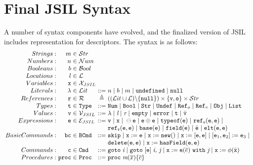 \documentclass[a4paper,11pt,twoside]{report}
\begin{document}
\section{Final JSIL Syntax}\label{sec:finjsilsyntax}
A number of syntax components have evolved, and the finalized version of JSIL includes representation for descriptors. The syntax is as follows:
$$
\arraycolsep=1.5pt
\begin{array}{rrclcl}
Strings : &  m & \in & \mathcal{S}tr \\
Numbers : &  n & \in & \mathcal{N}um \\
Booleans : &  b & \in & \mathcal{B}ool \\
Locations : &  l & \in & \mathcal{L} \\
Variables : &  \mathtt{x} & \in & \mathcal{X}_{JSIL} \\
Literals : &  \mathtt{\lambda} & \in & \mathcal{L}it & ::= & n \myor b \myor m \myor \mathtt{undefined} \myor \mathtt{null} \\
References : &  \mathtt{r} & \in & \mathcal{R} & \triangleq & ((\mathcal{L}it \cup \mathcal{L}) \backslash \{ \mathtt{null} \}) \times \{ \mathtt{v, o} \} \times \mathcal{S}tr\\
Types: & \mathtt{t} & \in & \mathtt{Type} & ::= & \mathtt{Num} \myor \mathtt{Bool} \myor \mathtt{Str} \myor \mathtt{Undef} \myor \mathtt{Ref}_o \myor \mathtt{Ref}_v \myor \mathtt{Obj} \myor \mathtt{List} \\
Values: & \mathtt{v} & \in & \mathcal{V}_{JSIL} & ::= &\lambda \myor \textit{l} \myor \textit{r} \myor \mathtt{empty} \myor \mathtt{error} \myor \mathtt{t} \myor \bar{\mathtt{v}} \\
Expressions: & \mathtt{e} & \in & \mathcal{E}_{JSIL} & ::= &\mathtt{v} \myor \mathtt{x} \myor \ominus \mathtt{e} \myor \mathtt{e} \oplus \mathtt{e} \myor \mathtt{typeof}(\mathtt{e}) \myor \mathtt{ref_o}(\mathtt{e,e}) \myor \\
& & & & & \mathtt{ref_v}(\mathtt{e,e}) \myor \mathtt{base}(\mathtt{e}) \myor \mathtt{field}(\mathtt{e}) \myor \bar{\mathtt{e}} \myor \mathtt{elt (e, e)}
\\
Basic Commands: & \mathtt{bc} & \in & \mathtt{BCmd} & ::= & \mathtt{skip} \myor \mathtt{x} := \mathtt{e} \myor \mathtt{x} := \mathtt{new}() \myor \mathtt{x} := [\mathtt{e,e}] \myor [\mathtt{e}_1,\mathtt{e}_2] := \mathtt{e}_3 \myor  \\
& & & & & \mathtt{delete}(\mathtt{e,e}) \myor \mathtt{x} := \mathtt{hasField}(\mathtt{e,e}) \\
Commands: & \mathtt{c} & \in & \mathtt{Cmd} & ::= & \mathtt{goto} \hspace{3pt} \textit{i} \myor \mathtt{goto} \hspace{3pt} [\mathtt{e}] \hspace{3pt} \textit{i, j} \myor \mathtt{x} := \mathtt{e}(\overline{e})\ \mathtt{with}\ \textit{j} \myor \mathtt{x} := \phi(\bar{\mathtt{x}})
\\
Procedures: & \mathtt{proc} & \in & \mathtt{Proc} & ::= & \mathtt{proc} \hspace{3pt} \textit{m}(\overline{x})\{\overline{c}\}
\end{array}
$$
\end{document}
